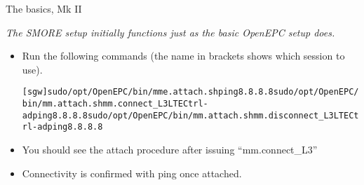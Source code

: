 \documentclass[xcolor=pdftex,dvipsnames,table]{beamer}
\begin{document}
\begin{frame}{The basics, Mk II}
  \fontsize{9}{10.2}\selectfont
  \centerline{\emph{The SMORE setup initially functions just as the basic OpenEPC setup does.}}
  \begin{itemize}
  \item Run the following commands (the name in brackets shows which session to use).
  \colorbox{SkyBlue!20}{
    \begin{minipage}{\textwidth}
      \begin{alltt}
        [sgw]   sudo /opt/OpenEPC/bin/{\color{red}mme}.attach.sh \newline
        [alice] ping 8.8.8.8 \newline
        [alice] sudo /opt/OpenEPC/bin/mm.attach.sh  mm.connect\_L3 LTE  Ctrl-a d \newline
        [alice] ping 8.8.8.8 \newline
        [alice] sudo /opt/OpenEPC/bin/mm.attach.sh  mm.disconnect\_L3 LTE  Ctrl-a d \newline
        [alice] ping 8.8.8.8
      \end{alltt}
    \end{minipage}
  }
  \item You should see the attach procedure after issuing ``mm.connect\_L3''
  \item Connectivity is confirmed with ping once attached.
  \end{itemize}
\end{frame}
\end{document}
